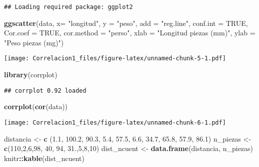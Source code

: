 \documentclass[
]{article}
\newenvironment{Shaded}{\begin{snugshade}}{\end{snugshade}}
\newcommand{\AttributeTok}[1]{\textcolor[rgb]{0.13,0.29,0.53}{#1}}
\newcommand{\ConstantTok}[1]{\textcolor[rgb]{0.56,0.35,0.01}{#1}}
\newcommand{\DecValTok}[1]{\textcolor[rgb]{0.00,0.00,0.81}{#1}}
\newcommand{\FloatTok}[1]{\textcolor[rgb]{0.00,0.00,0.81}{#1}}
\newcommand{\FunctionTok}[1]{\textcolor[rgb]{0.13,0.29,0.53}{\textbf{#1}}}
\newcommand{\NormalTok}[1]{#1}
\newcommand{\OtherTok}[1]{\textcolor[rgb]{0.56,0.35,0.01}{#1}}
\newcommand{\SpecialCharTok}[1]{\textcolor[rgb]{0.81,0.36,0.00}{\textbf{#1}}}
\newcommand{\StringTok}[1]{\textcolor[rgb]{0.31,0.60,0.02}{#1}}
\begin{document}
\begin{verbatim}
## Loading required package: ggplot2
\end{verbatim}

\begin{Shaded}
\begin{Highlighting}[]
\FunctionTok{ggscatter}\NormalTok{(data, }\AttributeTok{x=} \StringTok{"longitud"}\NormalTok{, }\AttributeTok{y =} \StringTok{"peso"}\NormalTok{,}
          \AttributeTok{add =} \StringTok{"reg.line"}\NormalTok{, }\AttributeTok{conf.int =} \ConstantTok{TRUE}\NormalTok{, }
          \AttributeTok{Cor.coef =} \ConstantTok{TRUE}\NormalTok{, }\AttributeTok{cor.method =} \StringTok{"perso"}\NormalTok{, }
          \AttributeTok{xlab =} \StringTok{"Longitud piezas (mm)"}\NormalTok{, }\AttributeTok{ylab =} \StringTok{"Peso piezas (mg)"}\NormalTok{)}
\end{Highlighting}
\end{Shaded}

\texttt{[image: Correlacion1\_files/figure-latex/unnamed-chunk-5-1.pdf]}

\begin{Shaded}
\begin{Highlighting}[]
\FunctionTok{library}\NormalTok{(corrplot)}
\end{Highlighting}
\end{Shaded}

\begin{verbatim}
## corrplot 0.92 loaded
\end{verbatim}

\begin{Shaded}
\begin{Highlighting}[]
\FunctionTok{corrplot}\NormalTok{(}\FunctionTok{cor}\NormalTok{(data))}
\end{Highlighting}
\end{Shaded}

\texttt{[image: Correlacion1\_files/figure-latex/unnamed-chunk-6-1.pdf]}

\begin{Shaded}
\begin{Highlighting}[]
\NormalTok{distancia }\OtherTok{\textless{}{-}} \FunctionTok{c}\NormalTok{ (}\FloatTok{1.1}\NormalTok{, }\FloatTok{100.2}\NormalTok{, }\FloatTok{90.3}\NormalTok{, }\FloatTok{5.4}\NormalTok{, }\FloatTok{57.5}\NormalTok{, }\FloatTok{6.6}\NormalTok{, }\FloatTok{34.7}\NormalTok{, }\FloatTok{65.8}\NormalTok{, }\FloatTok{57.9}\NormalTok{, }\FloatTok{86.1}\NormalTok{)}
\NormalTok{n\_piezas }\OtherTok{\textless{}{-}} \FunctionTok{c}\NormalTok{(}\DecValTok{110}\NormalTok{,}\DecValTok{2}\NormalTok{,}\DecValTok{6}\NormalTok{,}\DecValTok{98}\NormalTok{, }\DecValTok{40}\NormalTok{, }\DecValTok{94}\NormalTok{, }\FloatTok{31.}\NormalTok{,}\DecValTok{5}\NormalTok{,}\DecValTok{8}\NormalTok{,}\DecValTok{10}\NormalTok{)}
\NormalTok{dist\_ncuent }\OtherTok{\textless{}{-}} \FunctionTok{data.frame}\NormalTok{(distancia, n\_piezas)}
\NormalTok{knitr}\SpecialCharTok{::}\FunctionTok{kable}\NormalTok{(dist\_ncuent)}
\end{Highlighting}
\end{Shaded}
\end{document}
